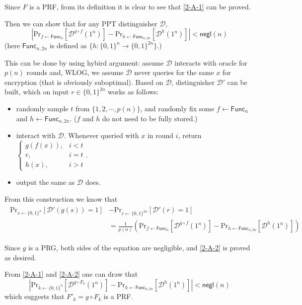 \documentclass[8pt]{article}
\theoremstyle{compact}
\begin{document}
Since $F$ is a PRF, from its definition it is clear to see that \cref{2-A-1} can be proved.

Then we can show that for any PPT distinguisher $\mathcal D$, \begin{equation}
	\left| \text{Pr}_{f \gets \textsf{Func}_n}\left[\mathcal D^{g \circ f}(1^n)\right] - \text{Pr}_{h \gets \textsf{Func}_{n, 2n}}\left[\mathcal D^{h}(1^n)\right] \right| < \textsf{negl}(n)\label{2-A-2}
\end{equation}
(here $\textsf{Func}_{n, 2n}$ is defined as $\{h: \{0, 1\}^n \to \{0, 1\}^{2n}\}$.)

This can be done by using hybird argument: assume $\mathcal D$ interacts with oracle for $p(n)$ rounds and, WLOG, we assume $\mathcal D$ never queries for the same $x$ for encryption (that is obviously suboptimal). Based on $\mathcal D$, distinguisher $\mathcal D'$ can be built, which on input $r \in \{0, 1\}^{2n}$ works as follows:
\begin{itemize}
	\item randomly sample $t$ from $\{1, 2, \cdots, p(n)\}$, and randomly fix some $f \gets \textsf{Func}_n$ and $h \gets \textsf{Func}_{n, 2n}$. ($f$ and $h$ do not need to be fully stored.)
	\item interact with $\mathcal D$. Whenever queried with $x$ in round $i$, return $\begin{cases}
		g(f(x)), & i < t \\
		r, & i = t \\
		h(x), & i > t
	\end{cases}$.
	\item output the same as $\mathcal D$ does.
\end{itemize}

From this construction we know that \begin{align*}
	\begin{split}
		\text{Pr}_{s \gets \{0, 1\}^n}\left[\mathcal D'(g(s)) = 1\right] &- \text{Pr}_{r \gets \{0, 1\}^{2n}}\left[\mathcal D'(r) = 1\right] \\&= \frac{1}{p(n)}\left(\text{Pr}_{f \gets \textsf{Func}_n}\left[\mathcal D^{g \circ f}(1^n)\right] - \text{Pr}_{h \gets \textsf{Func}_{n, 2n}}\left[\mathcal D^{h}(1^n)\right]\right)
	\end{split}
\end{align*}

Since $g$ is a PRG, both sides of the equation are negligible, and \cref{2-A-2} is proved as desired.

From \cref{2-A-1} and \cref{2-A-2} one can draw that \begin{equation}
	\left| \text{Pr}_{k \gets \{0, 1\}^n}\left[\mathcal D^{g \circ F_k}(1^n)\right] - \text{Pr}_{h \gets \textsf{Func}_{n, 2n}}\left[\mathcal D^{h}(1^n)\right] \right| < \textsf{negl}(n)
\end{equation}
which suggests that $F'_k = g \circ F_k$ is a PRF.
\end{document}
